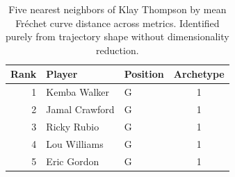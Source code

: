 \begin{table}[htbp]
  \centering\small
  \begin{tabular}{rllc}
    \toprule
    Rank & Player & Position & Archetype \\
    \midrule
    1 & Kemba Walker & G & 1 \\
    2 & Jamal Crawford & G & 1 \\
    3 & Ricky Rubio & G & 1 \\
    4 & Lou Williams & G & 1 \\
    5 & Eric Gordon & G & 1 \\
    \bottomrule
  \end{tabular}
  \caption{Five nearest neighbors of Klay Thompson by mean Fr\'{e}chet curve distance across metrics. Identified purely from trajectory shape without dimensionality reduction.}
  \label{tab:Klay_Thompson_frechet_curve_neighbors}
\end{table}

